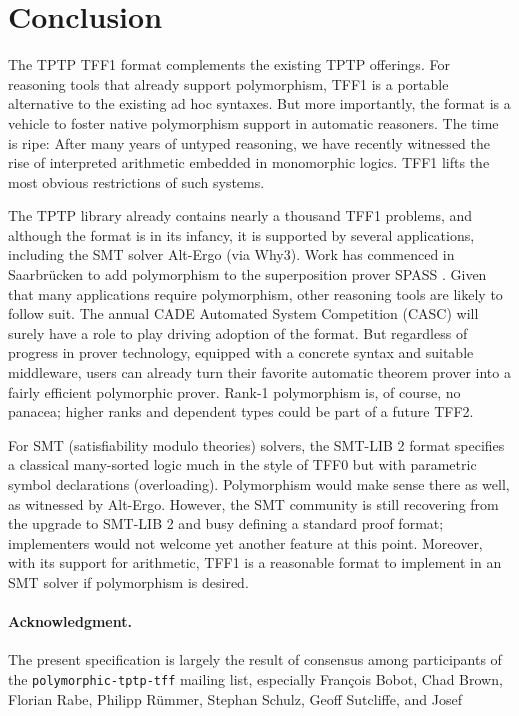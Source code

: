 \section{Conclusion}
\label{sec_concl}

The TPTP TFF1 format complements the existing TPTP
offerings. %
For reasoning tools that already
support polymorphism, TFF1 is a portable alternative to the existing ad hoc
syntaxes. But more importantly, the format is a vehicle to foster native
polymorphism support in automatic reasoners.
The time is ripe: After many
years of untyped reasoning, we have recently witnessed the rise of
interpreted arithmetic embedded in monomorphic logics. TFF1
lifts the most obvious restrictions of such systems.

The TPTP library already contains
nearly a thousand TFF1 problems, and although the format is in its
infancy, it is supported by several applications, including the SMT solver
Alt-Ergo (via Why3).
Work has commenced in Saarbr\"ucken to add polymorphism to the
superposition prover SPASS \cite{wand-weidenbach-2012}.
Given that many applications require polymorphism, other reasoning tools are
likely to follow suit.
The annual CADE Automated System Competition (CASC) will surely have a role
to play driving adoption of the format.
But regardless of progress in
prover technology, equipped with a concrete syntax and suitable middleware,
users can already turn their favorite automatic theorem prover into a
fairly efficient polymorphic prover.
Rank-1 polymorphism is, of course, no panacea; higher ranks and dependent types
could be part of a future TFF2.

For SMT (satisfiability modulo theories) solvers, the SMT-LIB 2 format \cite{barrett-et-al-2010} specifies a
classical many-sorted logic %
much in the style of TFF0 but with parametric symbol declarations (overloading).
Polymorphism would make sense there as well, as witnessed by Alt-Ergo.
However, the SMT community is still recovering from the %
upgrade to SMT-LIB 2 and busy defining a standard proof format;
implementers would %
not welcome yet another
feature at this point. Moreover, with its support for arithmetic, TFF1 is a
reasonable format to implement in an SMT solver if polymorphism is desired.

\def\ackname{Acknowledgment}
\paragraph{\textbf{\upshape\ackname.}}
%
The present specification is largely the result of consensus among
participants of the {\tt polymorphic-tptp-tff} mailing list,
especially Fran\c{c}ois Bobot, Chad Brown, Florian Rabe, Philipp R\"ummer,
Stephan Schulz, Geoff Sutcliffe, and Josef

